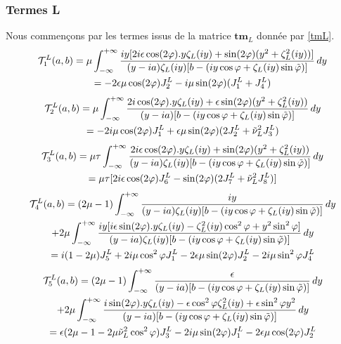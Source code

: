 \subsubsection{Termes L}
Nous commençons par les termes issus de la matrice $\mathbf{tm}_L$ donnée par \eqref{tmL}.
\begin{multline}
\mathcal{T}_1^L(a,b)= \mu \int_{-\infty}^{+\infty} \frac{iy\lbrack 2i\epsilon\cos(2\varphi).y\zeta_L(iy)+\sin(2\varphi)(y^2+\zeta_L^2(iy))\rbrack}{(y-ia)\zeta_L(iy)\lbrack b- (iy\cos \varphi+ \zeta_L(iy)\sin\phiti) \rbrack} \, dy \\
\hfill =-2\epsilon\mu\cos(2\varphi)J_2^L-i\mu\sin(2\varphi)(J_1^L+J_4^L) \hfill
\end{multline}
\begin{multline}
\mathcal{T}_2^L(a,b)=\mu \int_{-\infty}^{+\infty} \frac{2i \cos(2\varphi).y\zeta_L(iy)+\epsilon \sin(2\varphi)(y^2+\zeta_L^2(iy))}{(y-ia)\lbrack b- (iy\cos \varphi+\zeta_L(iy)\sin\phiti )\rbrack} \, dy \\
\hfill =-2i\mu\cos(2\varphi)J_1^L+\epsilon\mu\sin(2\varphi)(2J_2^L+\nuti_L^2J_3^L) \hfill
\end{multline}
\begin{multline}
\mathcal{T}_3^L(a,b)=\mu\tau \int_{-\infty}^{+\infty} \frac{ 2i\epsilon\cos(2\varphi).y\zeta_L(iy)+\sin(2\varphi)(y^2+\zeta_L^2(iy))}{(y-ia)\zeta_L(iy)\lbrack b- (iy\cos \varphi+ \zeta_L(iy)\sin \phiti) \rbrack} \, dy \\
\hfill =\mu\tau \lbrack 2i\epsilon\cos(2\varphi)J_6^L-\sin(2\varphi)(2J_7^L+\nuti_L^2J_8^L) \rbrack \hfill
\end{multline}
\begin{multline}
\mathcal{T}_4^L(a,b)= (2\mu-1) \int_{-\infty}^{+\infty}\frac{iy}{(y-ia)\zeta_L(iy)\lbrack b-(iy\cos \varphi+\zeta_L(iy)\sin\phiti) \rbrack} \, dy \\
+2 \mu\int_{-\infty}^{+\infty} \frac{iy\lbrack i\epsilon\sin(2\varphi).y\zeta_L(iy)-\zeta_L^2(iy)\cos^2\varphi+y^2\sin^2\varphi \rbrack}{(y-ia)\zeta_L(iy)\lbrack b- (iy\cos \varphi+\zeta_L(iy)\sin\phiti) \rbrack} \, dy\\
\hfill=i(1-2\mu)J_5^L+2i\mu\cos^2\varphi J_1^L-2\epsilon\mu\sin(2\varphi)J_2^L-2i\mu\sin^2\varphi J_4^L \hfill
\end{multline}
\begin{multline}
\mathcal{T}_5^L(a,b)= (2\mu-1) \int_{-\infty}^{+\infty}\frac{\epsilon}{(y-ia)\lbrack b- (iy\cos \varphi+\zeta_L(iy)\sin\phiti) \rbrack} \, dy \\
+2\mu\int_{-\infty}^{+\infty} \frac{ i\sin(2\varphi).y\zeta_L(iy)-\epsilon \cos^2\varphi \zeta_L^2(iy)+\epsilon \sin^2\varphi y^2}{(y-ia)\lbrack b- (iy\cos \varphi+\zeta_L(iy)\sin\phiti) \rbrack} \, dy \\
\hfill=\epsilon(2\mu-1-2\mu\nuti_L^2\cos^2\varphi)J_3^L-2i\mu\sin(2\varphi)J_1^L-2\epsilon\mu\cos(2\varphi)J_2^L\hfill
\end{multline}
